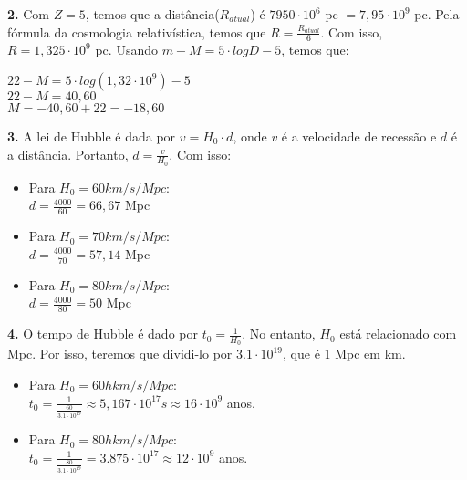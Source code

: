 \documentclass[12pt,letterpaper]{article}
\begin{document}
		\textbf{2.} Com $Z = 5$, temos que a distância($R_{atual}$) é $7950 \cdot 10^6$ pc $= 7,95 \cdot 10^9$ pc. Pela fórmula da cosmologia relativística, temos que $R = \frac{R_{atual}}{6}$. Com isso, $R = 1,325 \cdot 10^9$ pc. Usando $m - M = 5\cdot logD - 5$, temos que:
		
		\begin{center}
			$22 - M = 5\cdot log(1,32\cdot 10^9) - 5$\\
			$22 - M = 40,60$\\
			$M = -40,60 + 22 = -18,60$	
		\end{center}
		
		\textbf{3.} A lei de Hubble é dada por $v = H_0 \cdot d$, onde $v$ é a velocidade de recessão e $d$ é a distância. Portanto, $d = \frac{v}{H_0}$. Com isso:
		
		\begin{multicols}{2}
			\begin{itemize}
				\item Para  $H_0=60 km/s/Mpc$:\\
				$d = \frac{4000}{60} = 66,67$ Mpc\\
				\item Para  $H_0=70 km/s/Mpc$:\\
				$d = \frac{4000}{70} = 57,14$ Mpc\\
				\item Para  $H_0=80 km/s/Mpc$:\\
				$d = \frac{4000}{80} = 50$ Mpc\\
			\end{itemize}
		\end{multicols}
	
		\textbf{4.} O tempo de Hubble é dado por $t_0 = \frac{1}{H_0}$. No entanto, $H_0$ está relacionado com Mpc. Por isso, teremos que dividi-lo por $3.1\cdot 10^{19}$, que é 1 Mpc em km.
		
		\begin{multicols}{2}
			\begin{itemize}
				\item Para  $H_0=60h km/s/Mpc$:\\
				$t_0 = \frac{1}{\frac{60}{3.1\cdot 10^{19}}} \approx 5,167 \cdot 10^{17} s \approx 16 \cdot 10^9$ anos.\\
				\item Para  $H_0=80h km/s/Mpc$:\\
				$t_0 = \frac{1}{\frac{80}{3.1\cdot 10^{19}}} = 3.875 \cdot 10^{17} \approx 12 \cdot 10^9$ anos.\\
			\end{itemize}
		\end{multicols}
		
\end{document}
